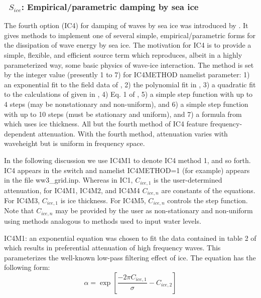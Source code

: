 \vsssub
\subsubsection{~$S_{ice}$: Empirical/parametric damping by sea ice} \label{sec:ICE4}
\vsssub


\noindent
The fourth option ({\code IC4}) for damping of waves by sea ice was introduced by \cite{rep:CR17}. It gives methods to implement one of several simple, empirical/parametric forms for the dissipation of wave energy by sea ice.  The motivation for {\code IC4} is to provide a simple, flexible, and efficient source term which reproduces, albeit in a highly parameterized way, some basic physics of wave-ice interaction. The method is set by the integer value (presently 1 to 7) for {\code IC4METHOD} namelist parameter: 1) an exponential fit to the field data of \cite{art:WAD88}, 2) the polynomial fit in \cite{art:MBK14}, 3) a quadratic fit to the calculations of \cite{art:KM08} given in \cite{art:HT15}, 4) Eq. 1 of \cite{art:Ko14}, 5) a simple step function with up to 4 steps (may be nonstationary and non-uniform), and 6) a simple step function with up to 10 steps (must be stationary and uniform), and 7) a formula from \cite{art:Dob15} which uses ice thickness. All but the fourth method of {\code IC4} feature frequency-dependent attenuation. With the fourth method, attenuation varies with waveheight but is uniform in frequency space. 

In the following discussion we use {\code IC4M1} to denote {\code IC4} method 1, and so forth. {\code IC4} appears in the {\file switch} and namelist {\code IC4METHOD=1} (for example) appears in the file {\file ww3\_grid.inp}. Whereas in {\code IC1}, ${C_{ice,1}}$ is the user-determined attenuation, for {\code IC4M1}, {\code IC4M2}, and {\code IC4M4} ${C_{ice,n}}$ are constants of the equations. For {\code IC4M3}, ${C_{ice,1}}$ is ice thickness. For {\code IC4M5}, ${C_{ice,n}}$ controls the step function. Note that ${C_{ice,n}}$ may be provided by the user as non-stationary and non-uniform using methods analogous to methods used to input water levels.

{\code IC4M1}: an exponential equation was chosen to fit the data contained in table 2 of \cite{art:WAD88} which results in preferential attenuation of high frequency waves. This parameterizes the well-known low-pass filtering effect of ice. The equation has the following form:
\begin{equation}\label{eq:ice1}
  {\alpha} = \exp\left[\frac{-{2\pi}C_{ice, 1}}{{\sigma}} - C_{ice, 2}\right]
\end{equation}

